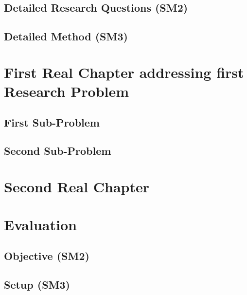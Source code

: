 \documentclass[
	a4paper,
	pagesize,
	pdftex,
	12pt,
	ngerman,
	fleqn,
	final,
	]{scrartcl}
\theoremstyle{definition}
\begin{document}
	\subsection{Detailed Research Questions (SM2)}
	
	\subsection{Detailed Method (SM3)}

\section{First Real Chapter addressing first Research Problem}

	\subsection{First Sub-Problem}
	
	\subsection{Second Sub-Problem}

\section{Second Real Chapter}

\section{Evaluation}

	\subsection{Objective (SM2)}
	
	\subsection{Setup (SM3)}
	
\end{document}
